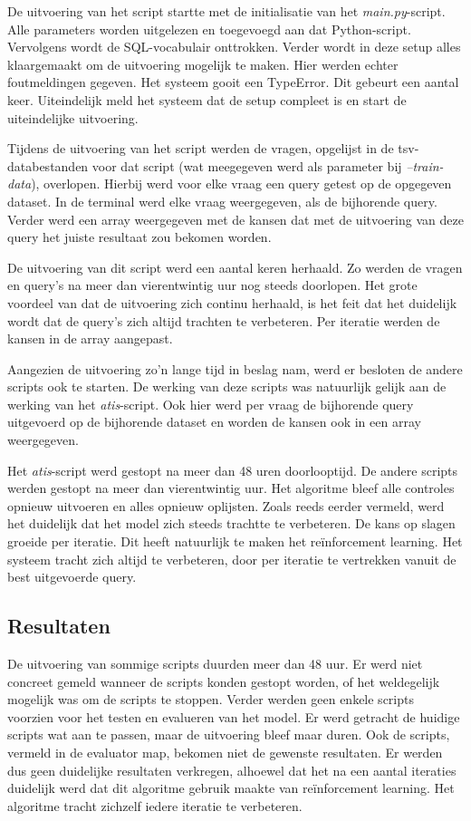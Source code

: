De uitvoering van het script startte met de initialisatie van het \textit{main.py}-script. Alle parameters worden uitgelezen en toegevoegd aan dat Python-script. Vervolgens wordt de SQL-vocabulair onttrokken. Verder wordt in deze setup alles klaargemaakt om de uitvoering mogelijk te maken. Hier werden echter foutmeldingen gegeven. Het systeem gooit een TypeError. Dit gebeurt een aantal keer. Uiteindelijk meld het systeem dat de setup compleet is en start de uiteindelijke uitvoering.

Tijdens de uitvoering van het script werden de vragen, opgelijst in de tsv-databestanden voor dat script (wat meegegeven werd als parameter bij \textit{--train-data}), overlopen. Hierbij werd voor elke vraag een query getest op de opgegeven dataset. In de terminal werd elke vraag weergegeven, als de bijhorende query. Verder werd een array weergegeven met de kansen dat met de uitvoering van deze query het juiste resultaat zou bekomen worden.

De uitvoering van dit script werd een aantal keren herhaald. Zo werden de vragen en query's na meer dan vierentwintig uur nog steeds doorlopen. Het grote voordeel van dat de uitvoering zich continu herhaald, is het feit dat het duidelijk wordt dat de query's zich altijd trachten te verbeteren. Per iteratie werden de kansen in de array aangepast.

Aangezien de uitvoering zo'n lange tijd in beslag nam, werd er besloten de andere scripts ook te starten. De werking van deze scripts was natuurlijk gelijk aan de werking van het \textit{atis}-script. Ook hier werd per vraag de bijhorende query uitgevoerd op de bijhorende dataset en worden de kansen ook in een array weergegeven.

Het \textit{atis}-script werd gestopt na meer dan 48 uren doorlooptijd. De andere scripts werden gestopt na meer dan vierentwintig uur. Het algoritme bleef alle controles opnieuw uitvoeren en alles opnieuw oplijsten. Zoals reeds eerder vermeld, werd het duidelijk dat het model zich steeds trachtte te verbeteren. De kans op slagen groeide per iteratie. Dit heeft natuurlijk te maken het reïnforcement learning. Het systeem tracht zich altijd te verbeteren, door per iteratie te vertrekken vanuit de best uitgevoerde query. 

\subsection{Resultaten}

De uitvoering van sommige scripts duurden meer dan 48 uur. Er werd niet concreet gemeld wanneer de scripts konden gestopt worden, of het weldegelijk mogelijk was om de scripts te stoppen. Verder werden geen enkele scripts voorzien voor het testen en evalueren van het model. Er werd getracht de huidige scripts wat aan te passen, maar de uitvoering bleef maar duren. Ook de scripts, vermeld in de evaluator map, bekomen niet de gewenste resultaten. Er werden dus geen duidelijke resultaten verkregen, alhoewel dat het na een aantal iteraties duidelijk werd dat dit algoritme gebruik maakte van reïnforcement learning. Het algoritme tracht zichzelf iedere iteratie te verbeteren.

